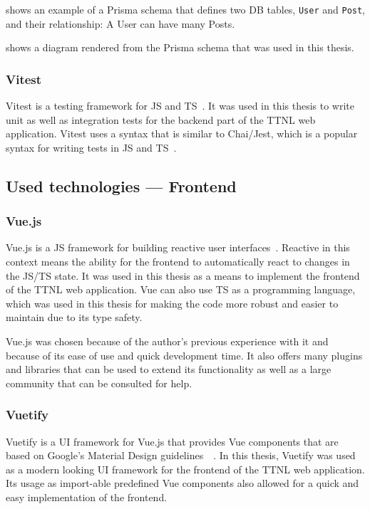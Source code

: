  shows an example of a Prisma schema that defines two \ac{DB} tables, \lstinline{User} and \lstinline{Post}, and their relationship: A User can have many Posts.

 shows a diagram rendered from the Prisma schema that was used in this thesis.

\subsubsection{Vitest}

Vitest is a testing framework for \ac{JS} and \ac{TS}~\cite{vitest_team_vitest-features_2023}.
It was used in this thesis to write unit as well as integration tests for the backend part of the \ac{TTNL} web application.
Vitest uses a syntax that is similar to Chai/Jest, which is a popular syntax for writing tests in \ac{JS} and \ac{TS}~\cite{vitest_team_vitest-features_2023}.

\subsection{Used technologies --- Frontend}

\subsubsection{Vue.js}

Vue.js is a \ac{JS} framework for building reactive user interfaces~\cite{evan_you_vuejs_2023}.
Reactive in this context means the ability for the frontend to automatically react to changes in the \ac{JS}/\ac{TS} state.
It was used in this thesis as a means to implement the frontend of the \ac{TTNL} web application.
Vue can also use \ac{TS} as a programming language, which was used in this thesis for making the code more robust and easier to maintain due to its type safety.

Vue.js was chosen because of the author's previous experience with it and because of its ease of use and quick development time.
It also offers many plugins and libraries that can be used to extend its functionality as well as a large community that can be consulted for help.

\subsubsection{Vuetify}

Vuetify is a \ac{UI} framework for Vue.js that provides Vue components that are based on Google's Material Design guidelines~\cite{vuetify_vuetify_2023}~\cite{google_llc_material_nodate}.
In this thesis, Vuetify was used as a modern looking \ac{UI} framework for the frontend of the \ac{TTNL} web application.
Its usage as import-able predefined Vue components also allowed for a quick and easy implementation of the frontend.

